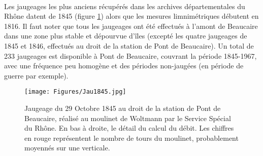 \documentclass[11pt]{article}
\begin{document}
    
	\begin{table}[h]
	\centering
	\caption{Détail des données de la station de Pont de Beaucaire (PK 267.7)}
    \label{tab:MesuresPtBcr}
        \end{table}           
        
       
    \paragraph{} Les jaugeages les plus anciens récupérés dans les archives départementales du Rhône datent de 1845 (figure \ref{fig:Jau1845}) alors que les mesures limnimétriques débutent en 1816. Il faut noter que tous les jaugeages ont été effectués à l'amont de Beaucaire dans une zone plus stable et dépourvue d'îles (excepté les quatre jaugeages de 1845 et 1846, effectués au droit de la station de Pont de Beaucaire). Un total de 233 jaugeages est disponible à Pont de Beaucaire, couvrant la période 1845-1967, avec une fréquence peu homogène et des périodes non-jaugées (en période de guerre par exemple). 
    
    \begin{figure}[h]
	\centering
		\texttt{[image: Figures/Jau1845.jpg]}
        \caption{Jaugeage du 29 Octobre 1845 au droit de la station de Pont de Beaucaire, réalisé au moulinet de Woltmann par le Service Spécial du Rhône. En bas à droite, le détail du calcul du débit. Les chiffres en rouge représentent le nombre de tours du moulinet, probablement moyennés sur une verticale.}	
		\label{fig:Jau1845}
	\end{figure}
    
\end{document}
